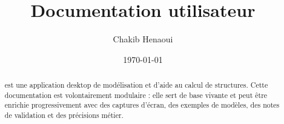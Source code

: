 \documentclass[11pt,a4paper]{report}
\title{\textbf{Documentation utilisateur}\\\logiciel}
\author{Chakib Henaoui}
\date{\today}
\begin{document}
\maketitle
\clearpage

\setcounter{page}{1}

\begin{abstract}
\logiciel{} est une application desktop de modélisation et d'aide au calcul
de structures. Cette documentation est volontairement modulaire : elle sert de
base vivante et peut être enrichie progressivement avec des captures d'écran,
des exemples de modèles, des notes de validation et des précisions métier.
\end{abstract}

\clearpage
\tableofcontents
\clearpage
\listoffigures
\clearpage
\listoftables

\clearpage
{}













\appendix


\nocite{pynite,openseespy}


\end{document}
